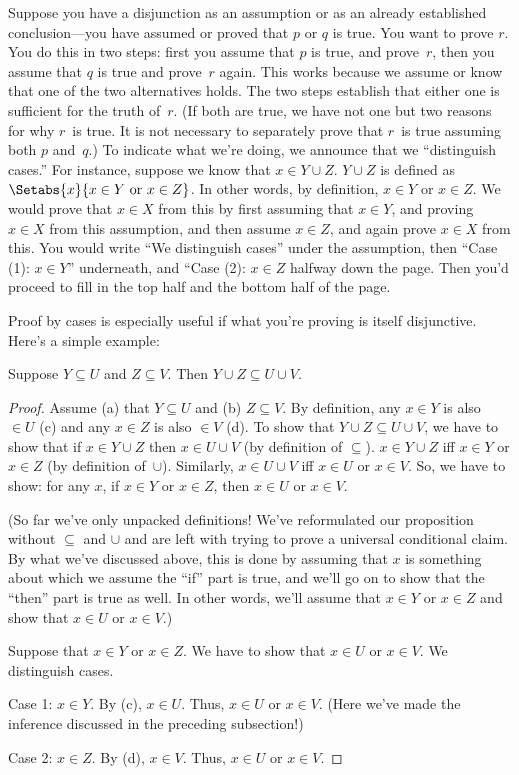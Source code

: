 \documentclass[../../../include/open-logic-section]{subfiles}
\begin{document}
Suppose you have a disjunction as an assumption or as an already
established conclusion---you have assumed or proved that $p$ or $q$ is
true.  You want to prove $r$.  You do this in two steps: first you
assume that $p$ is true, and prove~$r$, then you assume that $q$ is
true and prove~$r$ again.  This works because we assume or know that
one of the two alternatives holds. The two steps establish that either
one is sufficient for the truth of~$r$.  (If both are true, we have
not one but two reasons for why $r$~is true. It is not necessary to
separately prove that $r$~is true assuming both $p$ and~$q$.)  To
indicate what we're doing, we announce that we ``distinguish cases.''
For instance, suppose we know that $x \in Y \cup Z$.  $Y \cup Z$ is
defined as $\Setabs{x}{x \in Y \text{ or } x \in Z}$. In other words,
by definition, $x \in Y$ or $x \in Z$. We would prove that $x \in X$
from this by first assuming that $x \in Y$, and proving $x \in X$ from
this assumption, and then assume $x \in Z$, and again prove $x \in X$
from this.  You would write ``We distinguish cases'' under the
assumption, then ``Case (1): $x \in Y$'' underneath, and ``Case (2):
$x \in Z$ halfway down the page. Then you'd proceed to fill in the top
half and the bottom half of the page.

Proof by cases is especially useful if what you're proving is itself
disjunctive. Here's a simple example:

\begin{prop}
Suppose $Y \subseteq U$ and $Z \subseteq V$. Then $Y \cup Z \subseteq
U \cup V$.
\end{prop}

\begin{proof}
  Assume (a) that $Y \subseteq U$ and (b) $Z \subseteq V$. By
  definition, any $x \in Y$ is also $\in U$ (c) and any $x \in Z$ is
  also $\in V$ (d).  To show that $Y \cup Z \subseteq U \cup V$, we
  have to show that if $x \in Y \cup Z$ then $x \in U \cup V$ (by
  definition of $\subseteq$). $x \in Y \cup Z$ iff $x \in Y$ or $x \in
  Z$ (by definition of~$\cup$). Similarly, $x \in U \cup V$ iff $x \in
  U$ or $x \in V$. So, we have to show: for any $x$, if $x \in Y$ or
  $x \in Z$, then $x \in U$ or $x \in V$.

  (So far we've only unpacked definitions!{} We've reformulated our
  proposition without $\subseteq$ and $\cup$ and are left with trying
  to prove a universal conditional claim. By what we've discussed
  above, this is done by assuming that $x$ is something about which we
  assume the ``if'' part is true, and we'll go on to show that the
  ``then'' part is true as well. In other words, we'll assume that $x
  \in Y$ or $x \in Z$ and show that $x \in U$ or $x \in V$.)

  Suppose that $x \in Y$ or $x \in Z$. We have to show that $x \in U$
  or $x \in V$. We distinguish cases.

  Case 1: $x \in Y$. By (c), $x \in U$. Thus, $x \in U$ or $x \in
  V$. (Here we've made the inference discussed in the preceding
  subsection!)
      
  Case 2: $x \in Z$. By (d), $x \in V$. Thus, $x \in U$ or $x \in V$.
 \end{proof}
\end{document}
